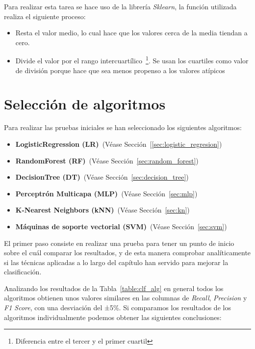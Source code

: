  Para realizar esta tarea se hace uso de la librería \textit{Sklearn}, la función utilizada realiza el siguiente proceso:
\begin{itemize}
\item Resta el valor medio, lo cual hace que los valores cerca de la media tiendan a cero.
\item Divide el valor por el rango intercuartílico~\footnote{Diferencia entre el tercer y el primer cuartil}. Se usan los cuartiles como valor de división porque hace que sea menos propenso a los valores atípicos
\end{itemize}

\section{Selección de algoritmos}

Para realizar las pruebas iniciales se han seleccionado los siguientes algoritmos:

\begin{itemize}
    \item \textbf{LogisticRegression (LR)}~(Véase Sección~[\ref{sec:logistic_regresion})
    
    \item \textbf{RandomForest (RF)}~(Véase Sección~\ref{sec:random_forest})
    
    \item \textbf{DecisionTree (DT)}~(Véase Sección~\ref{sec:decision_tree})
    
    \item \textbf{Perceptrón Multicapa (MLP)}~(Véase Sección~\ref{sec:mlp})
    
    \item \textbf{K-Nearest Neighbors (kNN)}~(Véase Sección~\ref{sec:kn})
    
    \item \textbf{Máquinas de soporte vectorial (SVM)}~(Véase Sección~\ref{sec:svm})
\end{itemize}

El primer paso consiste en realizar una prueba para tener un punto de inicio sobre el cuál comparar los resultados, y de esta manera comprobar analíticamente si las técnicas aplicadas a lo largo del capítulo han servido para mejorar la clasificación.

Analizando los resultados de la Tabla~\ref{table:clf_alg} en general todos los algoritmos obtienen unos valores similares en las columnas de \textit{Recall}, \textit{Precision} y \textit{F1 Score}, con una desviación del ±5\%. Si comparamos los resultados de los algoritmos individualmente podemos obtener las siguientes conclusiones:

